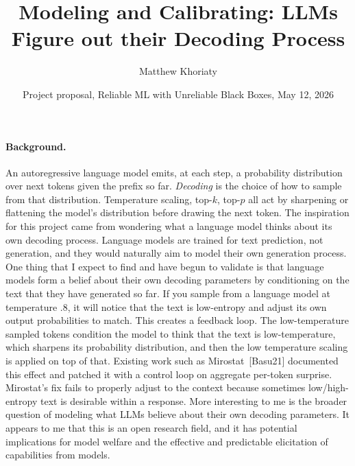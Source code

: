 \documentclass[11pt]{article}
\title{\vspace{-3.5em}Modeling and Calibrating: LLMs Figure out their Decoding Process}
\author{Matthew Khoriaty}
\date{Project proposal, Reliable ML with Unreliable Black Boxes, May 12, 2026}
\begin{document}
\maketitle
\vspace{-3em}
\enlargethispage{2\baselineskip}

\paragraph{Background.}
An autoregressive language model emits, at each step, a probability distribution over next tokens given the prefix so far.
\emph{Decoding} is the choice of how to sample from that distribution. Temperature scaling, top-$k$, top-$p$ all act by sharpening or flattening the model's distribution before drawing the next token.
The inspiration for this project came from wondering what a language model thinks about its own decoding process. Language models are trained for text prediction, not generation, and they would naturally aim to model their own generation process.
One thing that I expect to find and have begun to validate is that language models form a belief about their own decoding parameters by conditioning on the text that they have generated so far. If you sample from a language model at temperature $.8$, it will notice that the text is low-entropy and adjust its own output probabilities to match. This creates a feedback loop. The low-temperature sampled tokens condition the model to think that the text is low-temperature, which sharpens its probability distribution, and then the low temperature scaling is applied on top of that. 
Existing work such as Mirostat~[Basu21] documented this effect and patched it with a control loop on aggregate per-token surprise. Mirostat's fix fails to properly adjust to the context because sometimes low/high-entropy text is desirable within a response. 
More interesting to me is the broader question of modeling what LLMs believe about their own decoding parameters. It appears to me that this is an open research field, and it has potential implications for model welfare and the effective and predictable elicitation of capabilities from models. 
\end{document}
